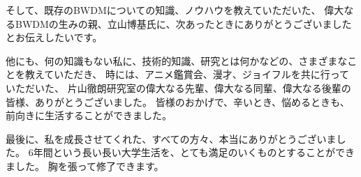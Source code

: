 \documentclass[uplatex, report, a4j, 10pt]{jsbook}
\begin{document}
そして、既存のBWDMについての知識、ノウハウを教えていただいた、
偉大なるBWDMの生みの親、立山博基氏に、次あったときにありがとうございましたとお伝えしたいです。

他にも、何の知識もない私に、技術的知識、研究とは何かなどの、さまざまなことを教えていただき、
時には、アニメ鑑賞会、漫才、ジョイフルを共に行っていただいた、
片山徹朗研究室の偉大なる先輩、偉大なる同輩、偉大なる後輩の皆様、ありがとうございました。
皆様のおかげで、辛いとき、悩めるときも、前向きに生活することができました。

最後に、私を成長させてくれた、すべての方々、本当にありがとうございました。
6年間という長い長い大学生活を、とても満足のいくものとすることができました。
胸を張って修了できます。

%

%
\end{document}
